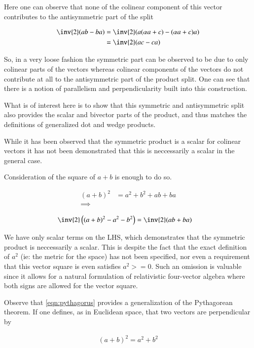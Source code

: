 \documentclass{article}
\begin{document}
Here one can observe that none of the colinear component of this vector
contributes to the antisymmetric part of the split

\begin{align*}
\inv{2}(a b - b a) &= \inv{2}(a (\alpha a + c) - (\alpha a + c) a) \\
&= \inv{2}(a c - c a) 
\end{align*}

So, in a very loose fashion the symmetric part can be observed to be
due to only colinear parts of the vectors whereas colinear components of the 
vectors do not contribute at all to the antisymmetric part of the product split.
One can see that there is a notion of parallelism and perpendicularity built
into this construction.

What is of interest here is to show that this symmetric and antisymmetric split
also provides the scalar and bivector parts of the product, and thus matches the
definitions of generalized dot and wedge products.

While it has been observed that the symmetric product is a scalar for colinear vectors
it has not been
demonstrated that this is neccessarily a scalar in the general case.

Consideration of the square of $a + b$ is enough to do so.

\begin{align*}
(a + b)^2 &= a^2 + b^2 + ab + ba \\
\implies \\
\end{align*}
\begin{align}\label{eqn:pythagorus}
\inv{2}\left((a + b)^2 - a^2 - b^2\right) &= \inv{2}(ab + ba)
\end{align}

We have only scalar terms on the LHS, which demonstrates that the symmetric product is neccessarily a scalar.
This is despite the fact that the exact definition of $a^2$ (ie: the metric for the space) has not been specified, nor even
a requirement that this vector square is even satisfies $a^2 >= 0$.  Such an omission is valuable since it allows
for a natural formulation of relativistic four-vector algebra where both signs are allowed for the vector square.

Observe that \ref{eqn:pythagorus} provides a generalization of the Pythagorean theorem.  If one defines, as in
Euclidean space, that two vectors are perpendicular by

\begin{align*}
(a + b)^2 = a^2 + b^2
\end{align*}
\end{document}
